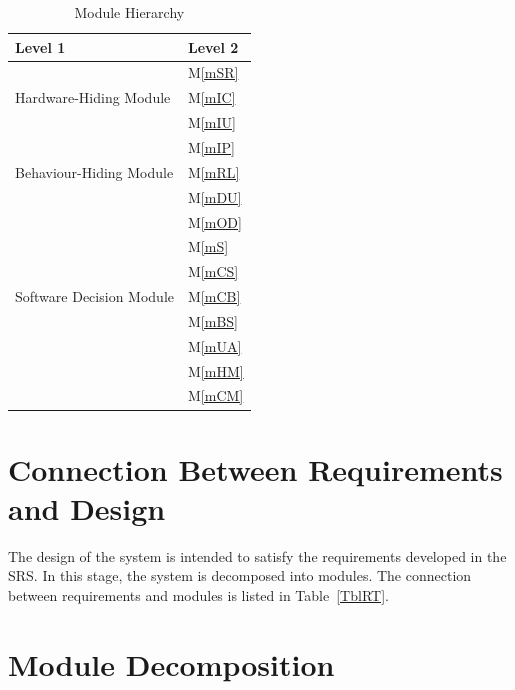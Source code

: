 \documentclass[12pt, titlepage]{article}
\newcommand{\mref}[1]{M\ref{#1}}
\begin{document}
\begin{table}[h!]
\centering
\begin{tabular}{p{} p{}}
\toprule
\textbf{Level 1} & \textbf{Level 2}\\
\midrule
\multirow{3}{0.3\textwidth}{Hardware-Hiding Module} & \mref{mSR}\\
& \mref{mIC}\\
& \mref{mIU}\\
\midrule

\multirow{3}{0.3\textwidth}{Behaviour-Hiding Module} 
& \mref{mIP} \\
& \mref{mRL} \\
& \mref{mDU} \\
\midrule

\multirow{7}{0.3\textwidth}{Software Decision Module} & \mref{mOD}\\
& \mref{mS} \\
& \mref{mCS}\\
& \mref{mCB}\\
& \mref{mBS} \\
& \mref{mUA} \\
& \mref{mHM} \\
& \mref{mCM} \\
\bottomrule

\end{tabular}
\caption{Module Hierarchy}
\label{TblMH}
\end{table}

\section{Connection Between Requirements and Design} \label{SecConnection}

The design of the system is intended to satisfy the requirements developed in
the SRS. In this stage, the system is decomposed into modules. The connection
between requirements and modules is listed in Table~\ref{TblRT}.


\section{Module Decomposition} \label{SecMD}
\end{document}
